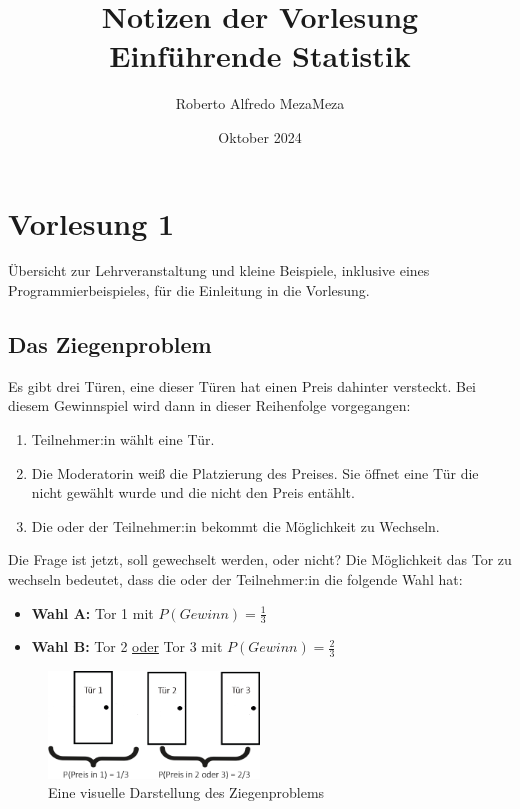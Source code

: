 \documentclass[12pt, a4paper]{article}
\title{Notizen der Vorlesung\\Einführende Statistik}
\author{Roberto Alfredo MezaMeza }
\date{Oktober 2024}
\begin{document}
\sloppy

\maketitle
\newpage

\section{Vorlesung 1}
    Übersicht zur Lehrveranstaltung und kleine Beispiele, inklusive eines Programmierbeispieles, für die Einleitung
    in die Vorlesung.

    \subsection{Das Ziegenproblem}
        Es gibt drei Türen, eine dieser Türen hat einen Preis dahinter versteckt. Bei diesem Gewinnspiel
        wird dann in dieser Reihenfolge vorgegangen:

        \begin{enumerate}
            \item Teilnehmer:in wählt eine Tür.
            \item Die Moderatorin weiß die Platzierung des Preises. Sie öffnet eine Tür die nicht gewählt wurde und die nicht den Preis entählt.
            \item Die oder der Teilnehmer:in bekommt die Möglichkeit zu Wechseln.
        \end{enumerate}

        Die Frage ist jetzt, soll gewechselt werden, oder nicht? Die Möglichkeit das Tor zu wechseln bedeutet, dass
        die oder der Teilnehmer:in die folgende Wahl hat:

        \begin{itemize}
            \item \textbf{Wahl A:} Tor 1 mit $P(Gewinn)=\frac{1}{3}$
            \item \textbf{Wahl B:} Tor 2 \underline{oder} Tor 3 mit $P(Gewinn)=\frac{2}{3}$
        \end{itemize}

        \begin{figure}[h]
            \centering
            \includegraphics[width=0.5\textwidth]{monty-hall-problem_example}
            \caption{Eine visuelle Darstellung des Ziegenproblems}
        \end{figure}
\end{document}
